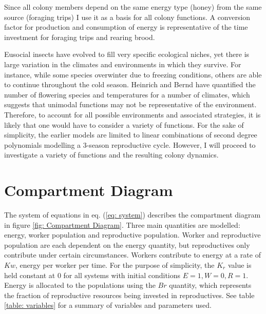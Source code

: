 \documentclass[12pt]{report}
\begin{document}
Since all colony members depend on the same energy type (honey) from the same source (foraging trips) I use it as a basis for all colony functions. A conversion factor for production and consumption of energy is representative of the time investment for foraging trips and rearing brood.

Eusocial insects have evolved to fill very specific ecological niches, yet there is large variation in the climates and environments in which they survive. For instance, while some species overwinter due to freezing conditions, others are able to continue throughout the cold season. Heinrich and Bernd \cite{heinrich1976resource} have quantified the number of flowering species and temperatures for a number of climates, which suggests that unimodal functions may not be representative of the environment. Therefore, to account for all possible environments and associated strategies, it is likely that one would have to consider a variety of functions. For the sake of simplicity, the earlier models are limited to linear combinations of second degree polynomials modelling a 3-season reproductive cycle. However, I will proceed to investigate a variety of functions and the resulting colony dynamics.



\section*{Compartment Diagram}
The system of equations in eq. (\ref{eq: system}) describes the compartment diagram in figure \ref{fig: Compartment Diagram}. Three main quantities are modelled: energy, worker population and reproductive population. Worker and reproductive population are each dependent on the energy quantity, but reproductives only contribute under certain circumstances. Workers contribute to energy at a rate of $Kw$, energy per worker per time. For the purpose of simplicity, the $K_r$ value is held constant at $0$ for all systems with initial conditions $E=1, W=0, R=1$. Energy is allocated to the populations using the $Br$ quantity, which represents the fraction of reproductive resources being invested in reproductives. See table \ref{table: variables} for a summary of variables and parameters used. 
\end{document}
